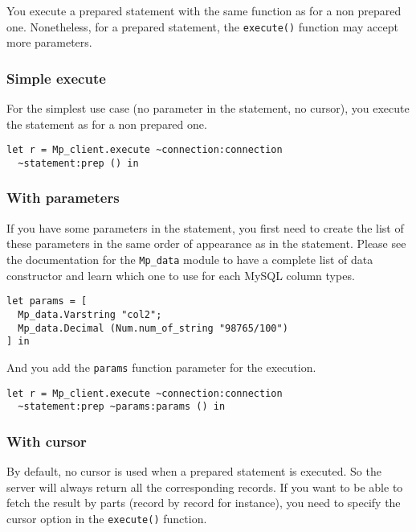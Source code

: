 \documentclass[a4paper, english, 11pt]{article}
\begin{document}
You execute a prepared statement with the same function as for a non prepared one. Nonetheless, for a prepared statement, the \texttt{execute()} function may accept more parameters.

\subsubsection{Simple execute}

For the simplest use case (no parameter in the statement, no cursor), you execute the statement as for a non prepared one.

\begin{verbatim}
let r = Mp_client.execute ~connection:connection
  ~statement:prep () in
\end{verbatim}

\subsubsection{With parameters}

If you have some parameters in the statement, you first need to create the list of these parameters in the same order of appearance as in the statement. Please see the documentation for the \texttt{Mp\_data} module to have a complete list of data constructor and learn which one to use for each MySQL column types.

\begin{verbatim}
let params = [
  Mp_data.Varstring "col2"; 
  Mp_data.Decimal (Num.num_of_string "98765/100")
] in
\end{verbatim}

And you add the \texttt{params} function parameter for the execution.

\begin{verbatim}
let r = Mp_client.execute ~connection:connection
  ~statement:prep ~params:params () in
\end{verbatim}

\subsubsection{With cursor}

By default, no cursor is used when a prepared statement is executed. So the server will always return all the corresponding records. If you want to be able to fetch the result by parts (record by record for instance), you need to specify the cursor option in the \texttt{execute()} function.
\end{document}
